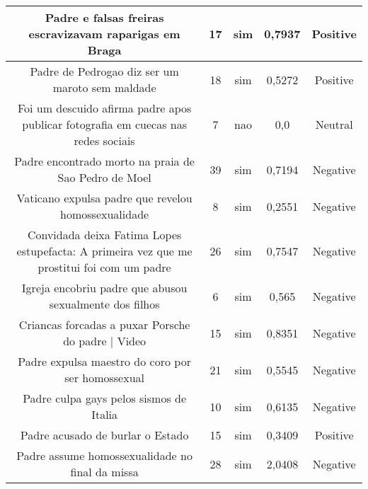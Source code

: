 \documentclass[11pt]{article}
\newlength\mylength
\begin{document}
\begin{center}
\begin{longtable}{||C{.40\mylength}||C{.20\mylength}||C{.20\mylength}||C{.30\mylength}||C{.20\mylength}||}
   Padre e falsas freiras escravizavam raparigas em Braga  & 17 & sim & 0,7937 & Positive \\  \hline
   Padre de Pedrogao diz ser um maroto sem maldade  & 18 & sim & 0,5272 & Positive \\  \hline
   Foi um descuido afirma padre apos publicar fotografia em cuecas nas redes sociais  & 7 & nao & 0,0 & Neutral \\  \hline
   Padre encontrado morto na praia de Sao Pedro de Moel  & 39 & sim & 0,7194 & Negative \\  \hline
   Vaticano expulsa padre que revelou homossexualidade  & 8 & sim & 0,2551 & Negative \\  \hline
   Convidada deixa Fatima Lopes estupefacta: A primeira vez que me prostitui foi com um padre  & 26 & sim & 0,7547 & Negative \\  \hline
   Igreja encobriu padre que abusou sexualmente dos filhos  & 6 & sim & 0,565 & Negative \\  \hline
   Criancas forcadas a puxar Porsche do padre | Video  & 15 & sim & 0,8351 & Negative \\  \hline
   Padre expulsa maestro do coro por ser homossexual  & 21 & sim & 0,5545 & Negative \\  \hline
   Padre culpa gays pelos sismos de Italia  & 10 & sim & 0,6135 & Negative \\  \hline
   Padre acusado de burlar o Estado  & 15 & sim & 0,3409 & Positive \\  \hline
   Padre assume homossexualidade no final da missa  & 28 & sim & 2,0408 & Negative \\  \hline

\end{longtable}
\end{center}
\end{document}
